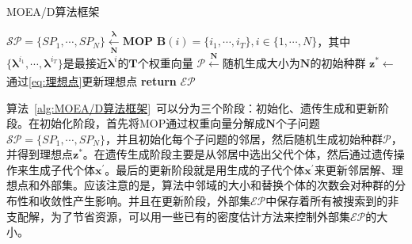 \begin{algorithm}[ht]
    \caption{MOEA/D算法框架}
    \label{alg:MOEA/D算法框架}
    \BlankLine
    $\mathcal{SP} = \{ SP_1, \cdots, SP_N \} \xleftarrow[\mathbf{N}]{\boldsymbol{\lambda}} \mathbf{MOP}$ \;
    $\mathbf{B}(i) = \{ i_1, \cdots, i_T \}, i \in \{ 1, \cdots, N \}$，其中$\{ \boldsymbol{\lambda}^{i_1}, \cdots, \boldsymbol{\lambda}^{i_T} \}$是最接近$\boldsymbol{\lambda}^i$的$\mathbf{T}$个权重向量 \;
    $\mathcal{P} \xleftarrow[]{\mathbf{N}} $随机生成大小为$\mathbf{N}$的初始种群 \;
    $\mathbf{z}^* \leftarrow $通过\autoref{eq:理想点}更新理想点 \;
    \textbf{return } $\mathcal{EP}$ \;
\end{algorithm}
\par
算法~\ref{alg:MOEA/D算法框架}~可以分为三个阶段：初始化、遗传生成和更新阶段。在初始化阶段，首先将MOP通过权重向量分解成$\mathbf{N}$个子问题$\mathcal{SP} = \{ SP_1, \cdots, SP_N \}$，并且初始化每个子问题的邻居，然后随机生成初始种群$\mathcal{P}$，并得到理想点$\mathbf{z}^*$。在遗传生成阶段主要是从邻居中选出父代个体，然后通过遗传操作来生成子代个体$\mathbf{x}^{'}$。最后的更新阶段就是用生成的子代个体$\mathbf{x}^{'}$来更新邻居解、理想点和外部集。应该注意的是，算法中邻域的大小和替换个体的次数会对种群的分布性和收敛性产生影响。并且在更新阶段，外部集$\mathcal{EP}$中保存着所有被搜索到的非支配解，为了节省资源，可以用一些已有的密度估计方法来控制外部集$\mathcal{EP}$的大小。


